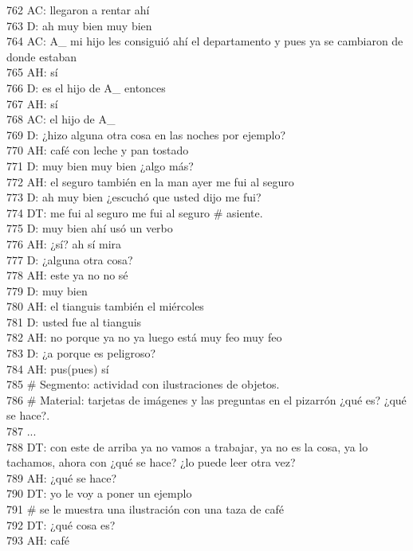 762 AC: llegaron a rentar ahí\\
763 D: ah muy bien muy bien\\
764 AC: A_ mi hijo les consiguió ahí el departamento y pues ya se cambiaron de donde estaban\\
765 AH: sí\\
766 D: es el hijo de A_ entonces\\
767 AH: sí\\
768 AC: el hijo de A_\\
769 D: ¿hizo alguna otra cosa en las noches por ejemplo?\\
770 AH: café con leche y pan tostado\\
771 D: muy bien muy bien ¿algo más?\\
772 AH: el seguro también en la man ayer me fui al seguro\\
773 D: ah muy bien ¿escuchó que usted dijo me fui?\\
774 DT: me fui al seguro me fui al seguro # asiente.\\
775 D: muy bien ahí usó un verbo\\
776 AH: ¿sí? ah sí mira\\
777 D: ¿alguna otra cosa?\\
778 AH: este ya no no sé\\
779 D: muy bien\\
780 AH: el tianguis también el miércoles\\
781 D: usted fue al tianguis\\
782 AH: no porque ya no ya luego está muy feo muy feo\\
783 D: ¿a porque es peligroso?\\
784 AH: pus(pues) sí\\
785 # Segmento: actividad con ilustraciones de objetos.\\
786 # Material: tarjetas de imágenes y las preguntas en el pizarrón ¿qué es? ¿qué se hace?.\\
787 ...\\
788 DT: con este de arriba ya no vamos a trabajar, ya no es la cosa, ya lo tachamos, ahora con ¿qué se hace? ¿lo puede leer otra vez?\\
789 AH: ¿qué se hace?\\
790 DT: yo le voy a poner un ejemplo\\
791 # se le muestra una ilustración con una taza de café\\
792 DT: ¿qué cosa es?\\
793 AH: café\\
